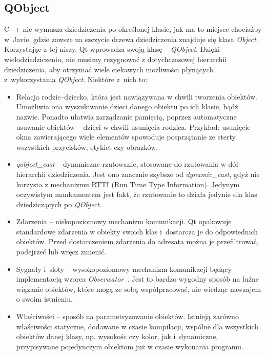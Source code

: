 \subsection{QObject}
C++ nie wymusza dziedziczenia po określonej klasie, jak ma to miejsce chociażby w~Javie, gdzie zawsze na szczycie drzewa dziedziczenia znajduje się klasa \textit{Object}. Korzystając z tej niszy, Qt wprowadza swoją klasę -- \textit{QObject}. Dzięki wielodziedziczeniu, nie musimy rezygnować z dotychczasowej hierarchii dziedziczenia, aby otrzymać wiele ciekawych możliwości płynących z~wykorzystania \textit{QObject}.
Niektóre z~nich to:
\begin{itemize}
\item Relacja rodzic--dziecko, która jest nawiązywana w chwili tworzenia obiektów. Umożliwia ona wyszukiwanie dzieci danego obiektu po ich klasie, bądź nazwie. Ponadto ułatwia zarządzanie pamięcią, poprzez automatyczne usuwanie obiektów -- dzieci w chwili usunięcia rodzica. Przykład: usunięcie okna zawierającego wiele elementów spowoduje posprzątanie ze sterty wszystkich przycisków, etykiet czy obrazków.
\item \textit{qobject\_cast} -- dynamiczne rzutowanie, stosowane do rzutowania w dół hierarchii dziedziczenia. Jest ono znacznie szybsze od \textit{dynamic\_cast}, gdyż nie korzysta z mechanizmu RTTI (Run Time Type Information). Jedynym oczywistym mankamentem jest fakt, że rzutowanie to działa jedynie dla klas dziedziczących po \textit{QObject}.
\item Zdarzenia -- niskopoziomowy mechanizm komunikacji. Qt opakowuje standardowe zdarzenia w obiekty swoich klas i~dostarcza je do odpowiednich obiektów. Przed dostarczeniem zdarzenia do adresata można je przefiltrować, podejrzeć lub wręcz zmienić.
\item Sygnały i~sloty -- wysokopoziomowy mechanizm komunikacji będący implementacją wzorca \textit{Obserwator}~\cite{Patterns}.
Jest to bardzo wygodny sposób na luźne wiązanie obiektów, które mogą ze sobą współpracować, nie wiedząc nawzajem o swoim istnieniu.
\item Właściwości -- sposób na parametryzowanie obiektów. Istnieją zarówno właściwości statyczne, dodawane w czasie kompilacji, wspólne dla wszystkich obiektów danej klasy, np. wysokośc czy kolor, jak i~dynamiczne, przypisywane pojedynczym obiektom już w czasie wykonania programu.
\end{itemize}

